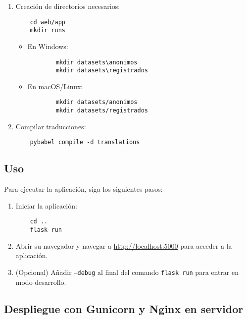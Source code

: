 \begin{enumerate}
    \item Creación de directorios necesarios:
    \begin{verbatim}
    cd web/app
    mkdir runs
    \end{verbatim}

    \begin{itemize}
        \item En Windows:
        \begin{verbatim}
        mkdir datasets\anonimos
        mkdir datasets\registrados
        \end{verbatim}

        \item En macOS/Linux:
        \begin{verbatim}
        mkdir datasets/anonimos
        mkdir datasets/registrados
        \end{verbatim}
    \end{itemize}

    \item Compilar traducciones:
    \begin{verbatim}
    pybabel compile -d translations
    \end{verbatim}
\end{enumerate}

\subsection{Uso}

Para ejecutar la aplicación, siga los siguientes pasos:

\begin{enumerate}
    \item Iniciar la aplicación:
    \begin{verbatim}
    cd ..
    flask run
    \end{verbatim}

    \item Abrir su navegador y navegar a \url{http://localhost:5000} para acceder a la aplicación.

    \item (Opcional) Añadir \texttt{--debug} al final del comando \texttt{flask run} para entrar en modo desarrollo.
\end{enumerate}

\subsection{Despliegue con Gunicorn y Nginx en servidor}

